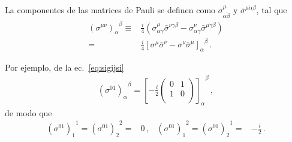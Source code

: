 \begin{frame}
La componentes de las matrices de Pauli se definen como $\sigma^{\mu}_{\alpha\dot{\beta}}$ y $\overline{\sigma}^{\mu\dot{\alpha}\beta}$, tal que
\begin{align*}
  {\left(\sigma^{\mu \nu}\right)_{\alpha}}^{\beta} \equiv & \frac{i}{4}\left(\sigma_{\alpha \dot{\gamma}}^{\mu} \bar{\sigma}^{\nu \dot{\gamma} \beta}-\sigma_{\alpha \dot{\gamma}}^{\nu} \bar{\sigma}^{\mu \dot{\gamma} \beta}\right) \nonumber\\
=&\frac{i}{4}{\left[\sigma^{\mu} \bar{\sigma}^{\nu}-\sigma^{\nu} \bar{\sigma}^{\mu}\right]_{\alpha}}^{\beta}\,.
\end{align*}

Por ejemplo, de la ec.~\eqref{eq:sigijsi}
\begin{align*}
  {\left(\sigma^{01}\right)_{\alpha}}^{\beta} =
  {\left[ -\frac{i}{2}
  \begin{pmatrix}
    0 & 1\\
    1 & 0\\
  \end{pmatrix}
\right]_{\alpha}}^{\beta}\,,
\end{align*}
de modo que
\begin{align*}
  {\left(\sigma^{0 1}\right)_{1}}^{1} =   {\left(\sigma^{0 1}\right)_{2}}^{2}=&0\,,
  &{\left(\sigma^{0 1}\right)_{1}}^{2} =   {\left(\sigma^{0 1}\right)_{2}}^{1}=&-\frac{i}{2}\,.
\end{align*}
\end{frame}


